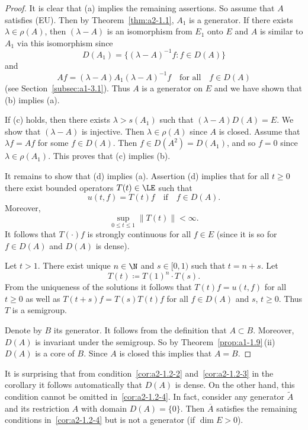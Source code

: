 \begin{proof}
It is clear that (a) implies the remaining assertions.
So assume that $A$ satisfies (EU).
Then by Theorem~\ref{thm:a2-1.1}, $A_{1}$ is a generator.
If there exists $\lambda \in \rho(A)$, then $(\lambda-A)$ is an isomorphism from $E_{1}$ onto $E$ and $A$ is similar to $A_{1}$ via this isomorphism since 
\[
D(A_{1}) = \{(\lambda-A)^{-1}f \colon f \in D(A)\}
\]
and 
%
\[
	Af = (\lambda-A)A_{1}(\lambda-A)^{-1}f
	\quad \text{for all} \quad f \in D(A)
\]
%
(see Section~\ref{subsec:a1-3.1}).
Thus $A$ is a generator on $E$ and we have shown that (b) implies (a).   

If (c)  holds, then there exists $\lambda > s(A_{1})$ such that $(\lambda-A)D(A) = E$.
We show that $(\lambda-A)$ is injective.
Then $\lambda \in \rho(A)$ since $A$ is closed.
Assume that $\lambda f = Af$ for some $f \in D(A)$.
Then $f \in D(A^{2}) = D(A_{1})$, and so $f = 0$ since $\lambda \in \rho(A_{1})$.
This proves that (c) implies (b).  

It remains to show that (d)  implies (a). 
Assertion (d) implies that for all $ t \geq 0 $ there exist bounded operators $ T(t) \in \LE $ such that 
%
\[
	u(t,f) = T(t)f 
	\quad \text{if} \quad 
	f \in D(A) .
\]
%
Moreover, 
%
\[
	\sup_{0 \leq t \leq 1} \|T(t)\| < \infty .
\]
%
It follows that $ T(\cdot)f $ is strongly continuous for all $ f \in E $ (since it is so for $ f \in D(A) $ and $ D(A) $ is dense).

Let $ t > 1 $.
There exist unique $ n \in \N $ and $ s \in [0,1) $ such that $ t = n + s $.
Let 
%
\[
	T(t) \coloneqq T(1)^{n} \cdot T(s) .
\]
%
From the uniqueness of the solutions it follows that $ T(t)f = u(t,f) $ for all $ t \geq 0 $ as well as $ T(t+s)f = T(s)T(t)f $ for all $ f \in D(A) $ and $ s$, $t \geq 0 $.
Thus $ T $ is a semigroup.

Denote by $ B $ its generator.
It follows from the definition that $ A \subset B $.
Moreover, $ D(A) $ is invariant under the semigroup.
So by Theorem~\ref{prop:a1-1.9}\,(ii) $ D(A) $ is a core of\/ $ B $.
Since $ A $ is closed this implies that $ A = B $.
\end{proof}
\begin{remark}\label{rem:a2-1.3}
It is surprising that from condition~\ref{cor:a2-1.2-2}   and~\ref{cor:a2-1.2-3}   in the corollary it follows automatically that $ D(A) $ is dense.
On the other hand, this condition cannot be omitted in~\ref{cor:a2-1.2-4}.   
In fact, consider any generator $ \tilde{A} $ and its restriction $ A $ with domain $ D(A) = \{0\} $.
Then $ \overline{A} $ satisfies the remaining conditions in~\ref{cor:a2-1.2-4} but is not a generator (if\/ $ \dim E > 0 $).
\end{remark}
